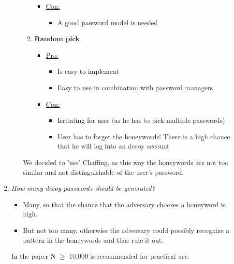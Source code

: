 \begin{enumerate}[(a)]
\begin{enumerate}[1.]
\begin{itemize}
\begin{enumerate}[1.]
\begin{itemize}
                    \item \underline{Con:}
                    \begin{itemize}
                        \item A good password model is needed
                    \end{itemize}
                \end{itemize}
                
                \item \textbf{Random pick}
                \begin{itemize}
                    \item \underline{Pro:}
                    \begin{itemize}
                        \item Is easy to implement
                        \item Easy to use in combination with password managers
                    \end{itemize}
                
                    \item \underline{Con:}
                    \begin{itemize}
                        \item Irritating for user (as he has to pick multiple passwords)
                        \item User has to forget the honeywords! There is a high chance that he will log into an decoy account
                    \end{itemize}
                \end{itemize}

            \end{enumerate}
            We decided to 'use' Chaffing, as this way the honeywords are not too similar and not distinguishable of the user's password.
        \end{itemize}
        
        
        \item {\itshape How many decoy passwords should be generated?}
        \begin{itemize}
            \item Many, so that the chance that the adversary chooses a honeyword is high.
            \item But not too many, otherwise the adversary could possibly recognize a pattern in the honeywords and thus rule it out.
        \end{itemize} 
        In the paper N $\geq$ 10,000 is recommended for practical use.
        

\end{enumerate}
\end{enumerate}
